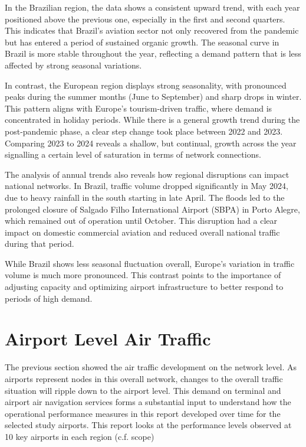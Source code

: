 \documentclass[
  a4paper,
  DIV=11,
  numbers=noendperiod]{scrreport}
\begin{document}
In the Brazilian region, the data shows a consistent upward trend, with
each year positioned above the previous one, especially in the first and
second quarters. This indicates that Brazil's aviation sector not only
recovered from the pandemic but has entered a period of sustained
organic growth. The seasonal curve in Brazil is more stable throughout
the year, reflecting a demand pattern that is less affected by strong
seasonal variations.

In contrast, the European region displays strong seasonality, with
pronounced peaks during the summer months (June to September) and sharp
drops in winter. This pattern aligns with Europe's tourism-driven
traffic, where demand is concentrated in holiday periods. While there is
a general growth trend during the post-pandemic phase, a clear step
change took place between 2022 and 2023. Comparing 2023 to 2024 reveals
a shallow, but continual, growth across the year signalling a certain
level of saturation in terms of network connections.

The analysis of annual trends also reveals how regional disruptions can
impact national networks. In Brazil, traffic volume dropped
significantly in May 2024, due to heavy rainfall in the south starting
in late April. The floods led to the prolonged closure of Salgado Filho
International Airport (SBPA) in Porto Alegre, which remained out of
operation until October. This disruption had a clear impact on domestic
commercial aviation and reduced overall national traffic during that
period.

While Brazil shows less seasonal fluctuation overall, Europe's variation
in traffic volume is much more pronounced. This contrast points to the
importance of adjusting capacity and optimizing airport infrastructure
to better respond to periods of high demand.

\section{Airport Level Air Traffic}\label{airport-level-air-traffic}

The previous section showed the air traffic development on the network
level. As airports represent nodes in this overall network, changes to
the overall traffic situation will ripple down to the airport level.
This demand on terminal and airport air navigation services forms a
substantial input to understand how the operational performance measures
in this report developed over time for the selected study airports. This
report looks at the performance levels observed at 10 key airports in
each region (c.f. scope)
\end{document}
